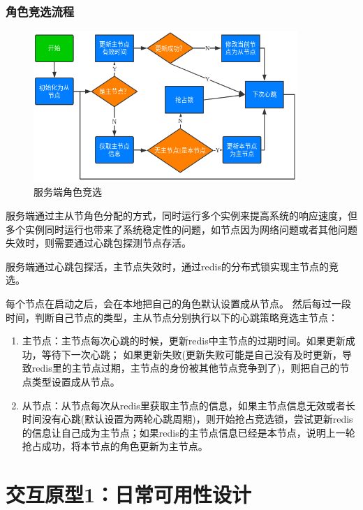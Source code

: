 \subsubsection{角色竞选流程}
\begin{figure}
    \centering
    \includegraphics[width=10cm]{images/slave-master.png}
    \caption{服务端角色竞选}
    \label{fig:slave_master}
\end{figure}

服务端通过主从节角色分配的方式，同时运行多个实例来提高系统的响应速度，但多个实例同时运行也带来了系统稳定性的问题，如节点因为网络问题或者其他问题失效时，则需要通过心跳包探测节点存活。

服务端通过心跳包探活，主节点失效时，通过redis的分布式锁实现主节点的竞选。

每个节点在启动之后，会在本地把自己的角色默认设置成从节点。
然后每过一段时间，判断自己节点的类型，主从节点分别执行以下的心跳策略竞选主节点：

\begin{enumerate}
    \item 主节点：主节点每次心跳的时候，更新redis中主节点的过期时间。如果更新成功，等待下一次心跳； 如果更新失败(更新失败可能是自己没有及时更新，导致redis里的主节点过期，主节点的身份被其他节点竞争到了)，则把自己的节点类型设置成从节点。
    
    \item 从节点：从节点每次从redis里获取主节点的信息，如果主节点信息无效或者长时间没有心跳(默认设置为两轮心跳周期)，则开始抢占竞选锁，尝试更新redis的信息让自己成为主节点；如果redis的主节点信息已经是本节点，说明上一轮抢占成功，将本节点的角色更新为主节点。 
\end{enumerate}


\section{交互原型1：日常可用性设计}

